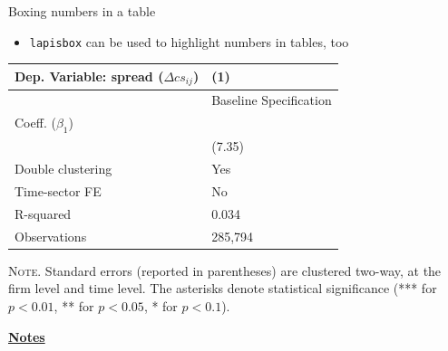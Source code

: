 \documentclass[10pt]{beamer}
\begin{document}
\begin{frame}
    {Boxing numbers in a table}
    \begin{itemize}
        \item \texttt{lapisbox} can be used to highlight numbers in tables, too \bigskip
    \end{itemize}
    \begin{table}[th]
        \centering%
        \begin{minipage}[b]{.6\textwidth}
            \vspace{.2cm}\tablesize
            \begin{tabularx}{\textwidth}{lY}
                \toprule
                Dep. Variable: spread ($\Delta cs_{ij}$) 	& (1)\\
                \midrule
                & {Baseline Specification} \\
                \midrule
                 Coeff. ($\beta_1$) 		&   \\
                &   (7.35) \\
                \midrule
                 Double clustering 		& Yes \\
                Time-sector FE 												& No \\
                 R-squared 					& 0.034 \\
                Observations 												& 285,794 \\\bottomrule
            \end{tabularx}\vspace{.2cm}\newline
            \tiny{{\scshape Note.} Standard errors (reported in parentheses) are clustered two-way, at the firm level and time level. The asterisks denote statistical significance (*** for $p<0.01$, ** for $p<0.05$, * for $p<0.1$).\newline}%
            \label{tab:label}%
        \end{minipage}
    \end{table}
\end{frame}
\begin{flushleft}
    \underline{\textbf{Notes}}\setlength{\parskip}{.15cm}\notesize\newline\par
\end{flushleft}
\end{document}
